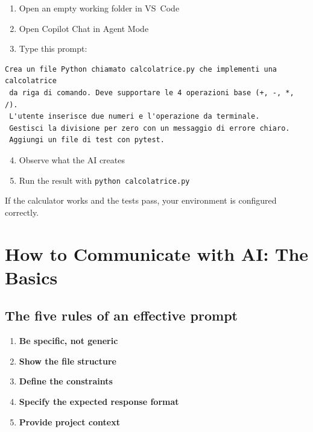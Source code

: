 \begin{praticabox}[title={Hands-on --- Generating a Python function}]
\begin{enumerate}
  \item Open an empty working folder in VS~Code
  \item Open Copilot Chat in Agent Mode
  \item Type this prompt:
\end{enumerate}
\begin{lstlisting}[language={}]
Crea un file Python chiamato calcolatrice.py che implementi una calcolatrice
 da riga di comando. Deve supportare le 4 operazioni base (+, -, *, /).
 L'utente inserisce due numeri e l'operazione da terminale.
 Gestisci la divisione per zero con un messaggio di errore chiaro.
 Aggiungi un file di test con pytest.
\end{lstlisting}
\begin{enumerate}
  \setcounter{enumi}{3}
  \item Observe what the AI creates
  \item Run the result with \texttt{python calcolatrice.py}
\end{enumerate}
\end{praticabox}

\begin{checkpointbox}
If the calculator works and the tests pass, your environment is configured correctly.
\end{checkpointbox}

\section{How to Communicate with AI: The Basics}

\subsection*{The five rules of an effective prompt}
\begin{enumerate}
  \item \textbf{Be specific, not generic}
  \item \textbf{Show the file structure}
  \item \textbf{Define the constraints}
  \item \textbf{Specify the expected response format}
  \item \textbf{Provide project context}
\end{enumerate}

